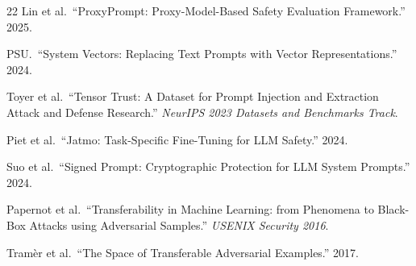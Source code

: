 \documentclass[11pt,a4paper]{article}
\begin{document}
\begin{thebibliography}{22}
Lin et al.\ ``ProxyPrompt: Proxy-Model-Based Safety Evaluation Framework.'' 2025.

PSU.\ ``System Vectors: Replacing Text Prompts with Vector Representations.'' 2024.

Toyer et al.\ ``Tensor Trust: A Dataset for Prompt Injection and Extraction Attack and Defense Research.''
\textit{NeurIPS 2023 Datasets and Benchmarks Track}.

Piet et al.\ ``Jatmo: Task-Specific Fine-Tuning for LLM Safety.'' 2024.

Suo et al.\ ``Signed Prompt: Cryptographic Protection for LLM System Prompts.'' 2024.

Papernot et al.\ ``Transferability in Machine Learning: from Phenomena to Black-Box Attacks using Adversarial Samples.''
\textit{USENIX Security 2016}.

Tram\`{e}r et al.\ ``The Space of Transferable Adversarial Examples.'' 2017.

\end{thebibliography}
\end{document}
